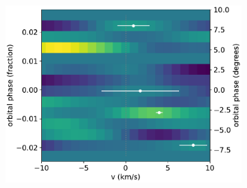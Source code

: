 \documentclass[twocolumn]{aastex631}
\begin{document}
\begin{figure}[ht!]
\begin{subfigure}[b]{0.333\textwidth}
            \label{fig:1d-ccf-Co-combined}
        \end{subfigure}
        \begin{subfigure}[b]{0.333\textwidth}
            \includegraphics[width=\textwidth]{plots-updated/line-velocity/binned/pcolor/points/KELT-20b.Co.phase-binned+RVs.pdf}
            \label{fig:wind-chars-Co-combined}
        \end{subfigure}


\end{figure}
\end{document}
